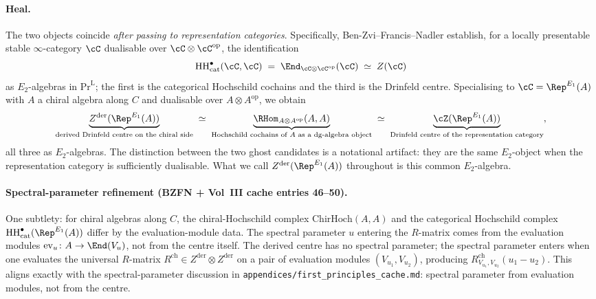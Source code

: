 \paragraph{Heal.}  The two objects coincide \emph{after passing to
representation categories}.  Specifically, Ben-Zvi--Francis--Nadler
\cite[Thm.~4.1]{BZFN2010} establish, for a locally presentable stable
$\infty$-category $\cC$ dualisable over $\cC \otimes \cC^{\mathrm{op}}$,
the identification
\[
 \mathrm{HH}^\bullet_{\mathrm{cat}}(\cC, \cC) \;=\;
 \End_{\cC \otimes \cC^{\mathrm{op}}}(\cC) \;\simeq\; Z(\cC)
\]
as $E_2$-algebras in $\mathrm{Pr}^{\mathrm{L}}$; the first is the
categorical Hochschild cochains and the third is the Drinfeld centre.
Specialising to $\cC = \Rep^{E_1}(A)$ with $A$ a chiral algebra along
$C$ and dualisable over $A \otimes A^{\mathrm{op}}$, we obtain
\[
 \underbrace{Z^{\mathrm{der}}(\Rep^{E_1}(A))}_{\text{derived Drinfeld
 centre on the chiral side}}
 \;\simeq\;
 \underbrace{\RHom_{A \otimes A^{\mathrm{op}}}(A, A)}_{\text{Hochschild
 cochains of $A$ as a dg-algebra object}}
 \;\simeq\;
 \underbrace{\cZ(\Rep^{E_1}(A))}_{\text{Drinfeld centre of the
 representation category}},
\]
all three as $E_2$-algebras.  The distinction between the two ghost
candidates is a notational artifact: they are the same $E_2$-object
when the representation category is sufficiently dualisable.  What we
call $Z^{\mathrm{der}}(\Rep^{E_1}(A))$ throughout is this common
$E_2$-algebra.

\paragraph{Spectral-parameter refinement (BZFN + Vol~III cache
entries 46--50).}  One subtlety: for chiral algebras along $C$, the
chiral-Hochschild complex $\mathrm{ChirHoch}(A, A)$ and the
categorical Hochschild complex $\mathrm{HH}^\bullet_{\mathrm{cat}}
(\Rep^{E_1}(A))$ differ by the evaluation-module data.  The spectral
parameter $u$ entering the $R$-matrix comes from the evaluation modules
$\mathrm{ev}_u \colon A \to \End(V_u)$, not from the centre itself.
The derived centre has no spectral parameter; the spectral parameter
enters when one evaluates the universal $R$-matrix
$R^{\mathrm{ch}} \in Z^{\mathrm{der}} \otimes Z^{\mathrm{der}}$ on a
pair of evaluation modules $(V_{u_1}, V_{u_2})$, producing
$R^{\mathrm{ch}}_{V_{u_1}, V_{u_2}}(u_1 - u_2)$.  This aligns exactly
with the spectral-parameter discussion in
\texttt{appendices/first\_principles\_cache.md}: spectral parameter
from evaluation modules, not from the centre.

